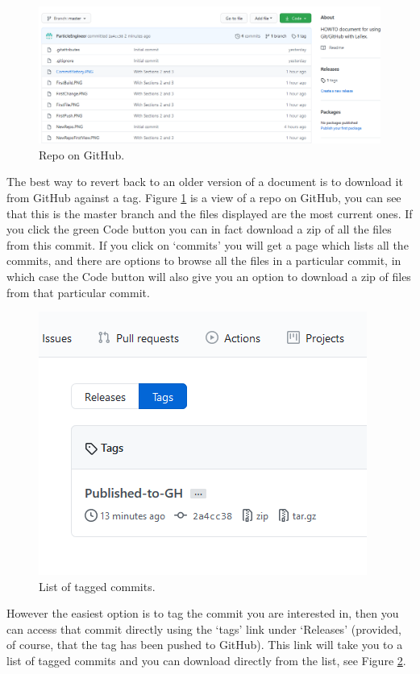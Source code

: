 \documentclass[a4paper, 12pt]{article}
\begin{document}
\begin{figure}
\centering
\includegraphics[width=\linewidth]{GHTag}
\caption{Repo on GitHub.}
\label{ghtag}
\end{figure}

The best way to revert back to an older version of a document is to download it from GitHub against a tag. Figure \ref{ghtag} is a view of a repo on GitHub, you can see that this is the master branch and the files displayed are the most current ones. If you click the green Code button you can in fact download a zip of all the files from this commit. If you click on `commits' you will get a page which lists all the commits, and there are options to browse all the files in a particular commit, in which case the Code button will also give you an option to download a zip of files from that particular commit.

\begin{figure}
\centering
\includegraphics{GHTag2}
\caption{List of tagged commits.}
\label{ghtag2}
\end{figure}

However the easiest option is to tag the commit you are interested in, then you can access that commit directly using the `tags' link under `Releases' (provided, of course, that the tag has been pushed to GitHub). This link will take you to a list of tagged commits and you can download directly from the list, see Figure \ref{ghtag2}. 
\end{document}
